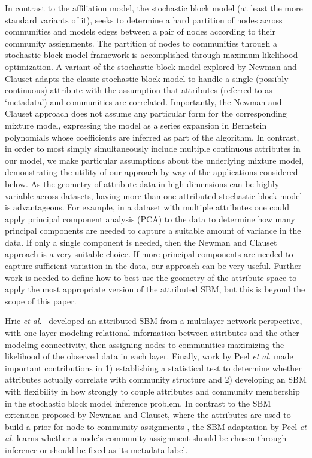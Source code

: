 In contrast to the affiliation model, the stochastic block model \cite{sbmOrig} (at least the more standard variants of it), seeks to determine a hard partition of nodes across communities and models edges between a pair of nodes according to their community assignments. The partition of nodes to communities through a stochastic block model framework is accomplished through maximum likelihood optimization. A variant of the stochastic block model explored by Newman and Clauset \cite{clauset} adapts the classic stochastic block model to handle a single (possibly continuous) attribute with the assumption that attributes (referred to as `metadata') and communities are correlated. Importantly, the Newman and Clauset approach does not assume any particular form for the corresponding mixture model, expressing the model as a series expansion in Bernstein polynomials whose coefficients are inferred as part of the algorithm. In contrast, in order to most simply simultaneously include multiple continuous attributes in our model, we make particular assumptions about the underlying mixture model, demonstrating the utility of our approach by way of the applications considered below. As the geometry of attribute data in high dimensions can be highly variable across datasets, having more than one attributed stochastic block model is advantageous. For example, in a dataset with multiple attributes one could apply principal component analysis (PCA) to the data to determine how many principal components are needed to capture a suitable amount of variance in the data. If only a single component is needed, then the Newman and Clauset approach is a very suitable choice. If more principal components are needed to capture sufficient variation in the data, our approach can be very useful. Further work is needed to define how to best use the geometry of the attribute space to apply the most appropriate version of the attributed SBM, but this is beyond the scope of this paper. 

Hric \emph{et al}.~\cite{hric} developed an attributed SBM from a multilayer network perspective, with one layer modeling relational information between attributes and the other modeling connectivity, then assigning nodes to communities maximizing the likelihood of the observed data in each layer. Finally, work by Peel \emph{et al.} \cite{peel2017ground} made important contributions in 1) establishing a statistical test to determine whether attributes actually correlate with community structure and 2) developing an SBM with flexibility in how strongly to couple attributes and community membership in the stochastic block model inference problem. In contrast to the SBM extension proposed by Newman and Clauset,  where the attributes are used to build a prior for node-to-community assignments \cite{clauset}, the SBM adaptation by Peel \emph{et al.} learns whether a node's community assignment should be chosen through inference or should be fixed as its metadata label. 

